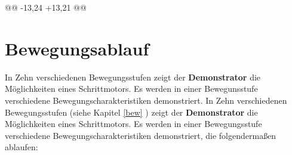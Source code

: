 @@ -13,24 +13,21 @@

\chapter{Bewegungsablauf}

In Zehn verschiedenen Bewegungsstufen zeigt der \textbf{Demonstrator} die Möglichkeiten eines Schrittmotors. Es werden in einer Bewegunsstufe verschiedene Bewegungscharakteristiken demonstriert. 
In Zehn verschiedenen Bewegungsstufen (siehe Kapitel \ref{bew} ) zeigt der \textbf{Demonstrator} die Möglichkeiten eines Schrittmotors. Es werden in einer Bewegungsstufe verschiedene Bewegungscharakteristiken demonstriert, die folgendermaßen ablaufen:  

